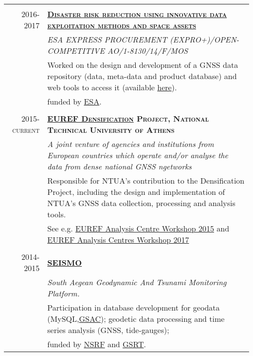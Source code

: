 \documentclass[9pt]{extarticle} %
\begin{document}
\begin{longtable}{r|p{13cm}}
%
\multicolumn{2}{c}{} \\
\textsc{2016-2017} & \textbf{\textsc{\href{http://www.astro.noa.gr/gr/research/projects/esa/}{Disaster risk reduction using innovative data exploitation methods and space assets}}}\\
  & \textit{\small ESA EXPRESS PROCUREMENT (EXPRO+)/OPEN-COMPETITIVE AO/1-8130/14/F/MOS}\\
  & Worked on the design and development of a GNSS data repository (data, meta-data and product database) and web tools to access it (available \href{http://ddrgsac.noa-gsp.terradue.com/ddrgsac}{here}).\\
  & funded by \href{http://www.esa.int/ESA}{ESA}.\\
%
\multicolumn{2}{c}{} \\
\textsc{2015-current} & \textbf{\textsc{\href{https://www.epncb.oma.be/_densification/}{EUREF Densification} Project, National Technical University of Athens}}\\
  & \textit{\small A joint venture of agencies and institutions from European countries which operate and/or analyse the data from dense national GNSS ngetworks}\\
  & Responsible for NTUA's contribution to the Densification Project, including the design and implementation of NTUA's GNSS data collection, processing and analysis tools.\\
  & See e.g. \href{https://www.epncb.oma.be/_newseventslinks/workshops/EPNLACWS_2015/pdf/planning_DSO_contribution_to_EUREF_densification.pdf}{EUREF Analysis Centre Workshop 2015} and \href{http://epncb.oma.be/_newseventslinks/workshops/EPNLACWS_2017/pdf/05_EPN_densification/03_xpapanikolaou.pdf}{EUREF Analysis Centres Workshop 2017}\\
%
\multicolumn{2}{c}{} \\
\textsc{2014-2015} & \textbf{\textsc{\href{http://dionysos.survey.ntua.gr/SEISMO/index.html}{SEISMO}}}\\
  & \textit{South Aegean Geodynamic And Tsunami Monitoring Platform.}\\
  & Participation in database development for geodata (MySQL,\href{http://www.unavco.org/software/data-management/gsac/gsac.html}{GSAC});
    geodetic data processing and time series analysis (GNSS, tide-gauges); \\
  & funded by \href{http://www.espa.gr/en/Pages/Default.aspx}{NSRF} and \href{http://www.gsrt.gr/central.aspx?sId=119I428I1089I323I488743}{GSRT}.\\

\end{longtable}
\end{document}
